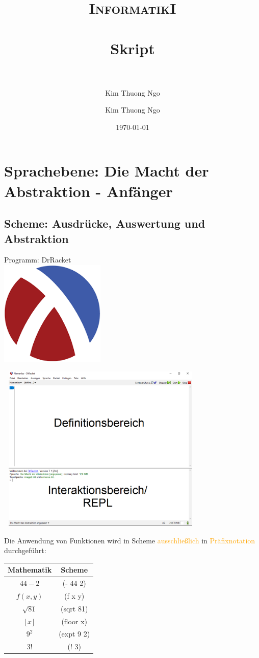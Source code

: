\documentclass[paper=a4, fontsize=11pt]{scrartcl}
\author{Kim Thuong Ngo}
\title{	
\normalfont \normalsize 
\textsc{InformatikI} \\ [25pt] 
\horrule{0.5pt} \\[0.4cm] 
\huge Skript \\ 
\horrule{2pt} \\[0.5cm] 
}
\author{Kim Thuong Ngo}
\date{\normalsize\today}
\numberwithin{equation}{section}
\numberwithin{figure}{section}
\numberwithin{table}{section}
\begin{document}
\maketitle 
\newpage
\tableofcontents
\newpage
\section{Sprachebene: Die Macht der Abstraktion - Anfänger}
\subsection{Scheme: Ausdrücke, Auswertung und Abstraktion}
Programm: DrRacket \\

\includegraphics[width=5cm,height=5cm]{Racketlogo.png}

\includegraphics[width=10cm,height=8cm]{Racketfenster2.png}

Die Anwendung von Funktionen wird in Scheme \textcolor{orange}{ausschließlich} in \textcolor{orange}{Präfixnotation} durchgeführt: \\

\begin{tabular}{c|c}
Mathematik & Scheme \\\hline
$44-2$ & (- 44 2) \\
$f(x,y)$ & (f x y)\\
$\sqrt{81}$ & (sqrt 81)\\
$\lfloor x \rfloor$ & (floor x)\\
$9^{2}$  & (expt 9 2) \\
3! & (! 3) \\
\end{tabular}
\end{document}

